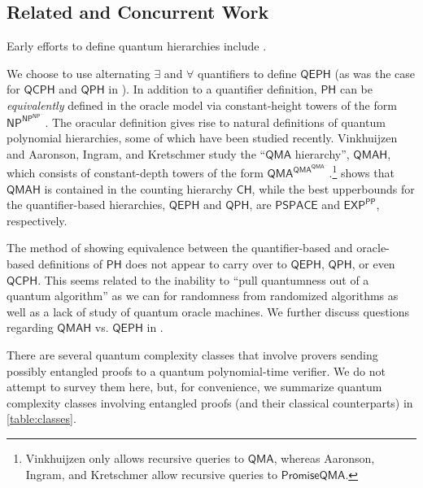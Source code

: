 \documentclass[10pt,a4paper]{article}
\theoremstyle{definition}
\newcommand{\class}[1]{\ensuremath{\mathsf{#1}}\xspace}
\newcommand{\NP}{\class{NP}}
\newcommand{\EXP}{\class{EXP}}
\newcommand{\PSPACE}{\class{PSPACE}}
\newcommand{\QMA}{\class{QMA}}
\newcommand{\CH}{\class{CH}}
\newcommand{\PP}{\class{PP}}
\newcommand{\PH}{\class{PH}}
\newcommand{\QCPH}{\class{QCPH}}
\newcommand{\QPH}{\class{QPH}}
\newcommand{\QEPH}{\class{QEPH}}
\newcommand{\QMAH}{\class{QMAH}}
\begin{document}
\subsection{Related and Concurrent Work}\label{subsec:related-work}
Early efforts to define quantum hierarchies include \cite{yamakami2002quantum,gharibian2012hardness}.

We choose to use alternating $\exists$ and $\forall$ quantifiers to define $\QEPH$ (as was the case for $\QCPH$ and $\QPH$ in \cite{GSSSY22_qph}).
In addition to a quantifier definition, $\PH$ can be \emph{equivalently} defined in the oracle model via constant-height towers of the form $\NP^{\NP^{\NP^{\ldots}}}$.
The oracular definition gives rise to natural definitions of quantum polynomial hierarchies, some of which have been studied recently.
Vinkhuijzen \cite{V18_BQPHthesis} and Aaronson, Ingram, and Kretschmer \cite{AIK22_acrobatics} study the ``$\QMA$ hierarchy'', $\mathsf{QMAH}$, which consists of constant-depth towers of the form $\QMA^{\QMA^{\QMA^{\ldots}}}$.\footnote{Vinkhuijzen only allows recursive queries to $\QMA$, whereas Aaronson, Ingram, and Kretschmer allow recursive queries to ${\mathsf{PromiseQMA}}$.}  
\cite[Theorem 5]{V18_BQPHthesis} shows that $\mathsf{QMAH}$ is contained in the counting hierarchy $\CH$, while the best upperbounds for the quantifier-based hierarchies, $\QEPH$ and $\QPH$, are $\PSPACE$ and $\EXP^\PP$, respectively. 

The method of showing equivalence between the quantifier-based and oracle-based definitions of $\PH$ does not appear to carry over to $\QEPH$, $\QPH$, or even $\QCPH$.
This seems related to the inability to ``pull quantumness out of a quantum algorithm'' as we can for randomness from randomized algorithms \cite{AIK22_acrobatics} as well as a lack of study of quantum oracle machines.
We further discuss questions regarding $\QMAH$ vs. $\QEPH$  in .

There are several quantum complexity classes that involve provers sending possibly entangled proofs to a quantum polynomial-time verifier. 
We do not attempt to survey them here, but, for convenience, we summarize quantum complexity classes involving entangled proofs (and their classical counterparts) in \cref{table:classes}. 
\end{document}

